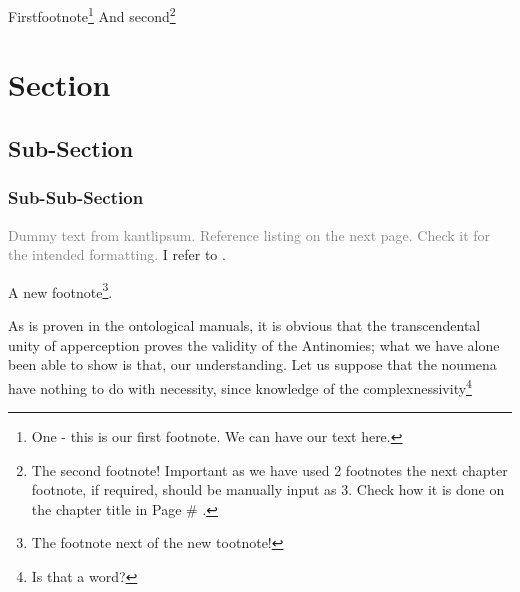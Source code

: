 \documentclass[12pt,mathdesign]{ndsu-thesis-2022}
\begin{document}
\kant[9]
Firstfootnote\footnote{One - this is our first footnote. We can have our text here.} And second\footnote{The second footnote! Important as we have used 2 footnotes the next chapter footnote, if required, should be manually input as 3. Check how it is done on the chapter title in Page \# \pageref{my2chap}.}



\kant[9]

\kant[2-4]


\checkEndRefsection%

\label{my2chap}

\checkBeginRefsection%

\kant[9]\kant[20]

\section{Section}
\subsection{Sub-Section}
\subsubsection{Sub-Sub-Section}

\textcolor{gray}{Dummy text from kantlipsum. Reference listing on the next page. Check it for the intended formatting.} I refer to \citep{butin2009education, rudestam2014surviving, Goossens2008g,cassuto2010advising,pires2021teens}. \kant[9]

A new footnote\footnote{The footnote next of the new tootnote!}.

As is proven in the ontological manuals, it is obvious that the transcendental unity of apperception proves the validity of the Antinomies; what we have alone been able to show is that, our understanding. Let us suppose that the noumena have nothing to do with necessity, since knowledge of the complexnessivity\footnote{Is that a word?}
\end{document}
